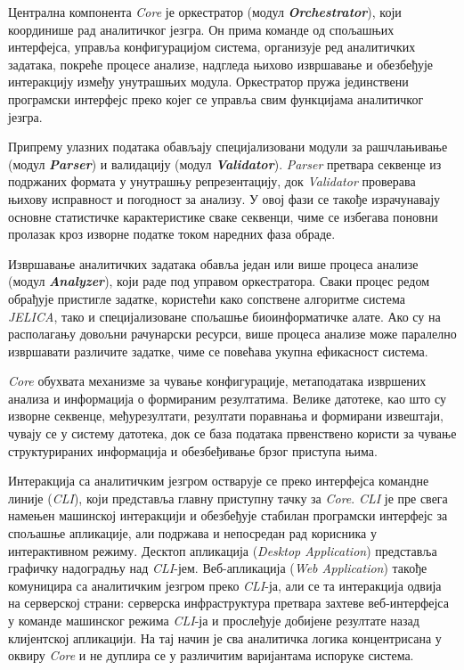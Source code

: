 \documentclass[12pt,oneside]{memoir}
\begin{document}
Централна компонента \textit{Core} је оркестратор (модул \textbf{\textit{Orchestrator}}), који координише рад аналитичког језгра. Он прима команде од спољашњих интерфејса, управља конфигурацијом система, организује ред аналитичких задатака, покреће процесе анализе, надгледа њихово извршавање и обезбеђује интеракцију између унутрашњих модула. Оркестратор пружа јединствени програмски интерфејс преко којег се управља свим функцијама аналитичког језгра.

Припрему улазних података обављају специјализовани модули за рашчлањивање (модул \textbf{\textit{Parser}}) и валидацију (модул \textbf{\textit{Validator}}). \textit{Parser} претвара секвенце из подржаних формата у унутрашњу репрезентацију, док \textit{Validator} проверава њихову исправност и погодност за анализу. У овој фази се такође израчунавају основне статистичке карактеристике сваке секвенци, чиме се избегава поновни пролазак кроз изворне податке током наредних фаза обраде.

Извршавање аналитичких задатака обавља један или више процеса анализе (модул \textbf{\textit{Analyzer}}), који раде под управом оркестратора. Сваки процес редом обрађује пристигле задатке, користећи како сопствене алгоритме система \textit{JELICA}, тако и специјализоване спољашње биоинформатичке алате. Ако су на располагању довољни рачунарски ресурси, више процеса анализе може паралелно извршавати различите задатке, чиме се повећава укупна ефикасност система.

\textit{Core} обухвата механизме за чување конфигурације, метаподатака извршених анализа и информација о формираним резултатима. Велике датотеке, као што су изворне секвенце, међурезултати, резултати поравнања и формирани извештаји, чувају се у систему датотека, док се база података првенствено користи за чување структурираних информација и обезбеђивање брзог приступа њима.

Интеракција са аналитичким језгром остварује се преко интерфејса командне линије (\textit{CLI}), који представља главну приступну тачку за \textit{Core}. \textit{CLI} је пре свега намењен машинској интеракцији и обезбеђује стабилан програмски интерфејс за спољашње апликације, али подржава и непосредан рад корисника у интерактивном режиму. Десктоп апликација (\textit{Desktop Application}) представља графичку надоградњу над \textit{CLI}-јем. Веб-апликација (\textit{Web Application}) такође комуницира са аналитичким језгром преко \textit{CLI}-ја, али се та интеракција одвија на серверској страни: серверска инфраструктура претвара захтеве веб-интерфејса у команде машинског режима \textit{CLI}-ја и прослеђује добијене резултате назад клијентској апликацији. На тај начин је сва аналитичка логика концентрисана у оквиру \textit{Core} и не дуплира се у различитим варијантама испоруке система.
\end{document}
